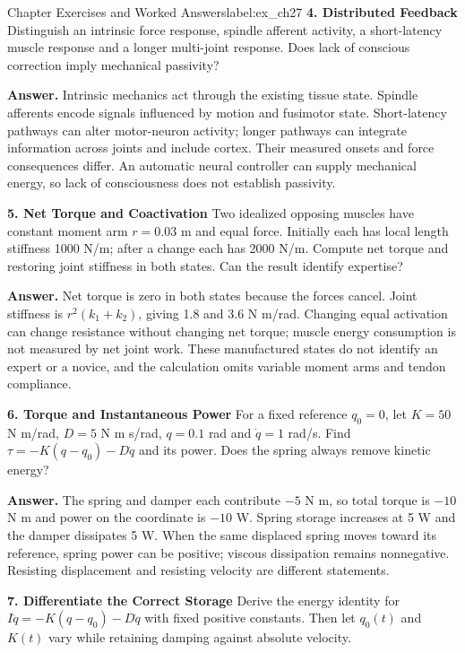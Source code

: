 \begin{exercises}{Chapter Exercises and Worked Answers}{label:ex_ch27}
\textbf{4. Distributed Feedback}
\label{ex:spinal_reflex}
Distinguish an intrinsic force response, spindle afferent activity, a short-latency muscle response and a longer multi-joint response. Does lack of conscious correction imply mechanical passivity?

\textbf{Answer.} Intrinsic mechanics act through the existing tissue state. Spindle afferents encode signals influenced by motion and fusimotor state. Short-latency pathways can alter motor-neuron activity; longer pathways can integrate information across joints and include cortex. Their measured onsets and force consequences differ. An automatic neural controller can supply mechanical energy, so lack of consciousness does not establish passivity.

\textbf{5. Net Torque and Coactivation}
\label{ex:novice_expert}
Two idealized opposing muscles have constant moment arm $r=0.03$ m and equal force. Initially each has local length stiffness 1000 N/m; after a change each has 2000 N/m. Compute net torque and restoring joint stiffness in both states. Can the result identify expertise?

\textbf{Answer.} Net torque is zero in both states because the forces cancel. Joint stiffness is $r^2(k_1+k_2)$, giving 1.8 and 3.6 N m/rad. Changing equal activation can change resistance without changing net torque; muscle energy consumption is not measured by net joint work. These manufactured states do not identify an expert or a novice, and the calculation omits variable moment arms and tendon compliance.

\textbf{6. Torque and Instantaneous Power}
\label{ex:impedance_equation}
For a fixed reference $q_0=0$, let $K=50$ N m/rad, $D=5$ N m s/rad, $q=0.1$ rad and $\dot q=1$ rad/s. Find $\tau=-K(q-q_0)-D\dot q$ and its power. Does the spring always remove kinetic energy?

\textbf{Answer.} The spring and damper each contribute $-5$ N m, so total torque is $-10$ N m and power on the coordinate is $-10$ W. Spring storage increases at 5 W and the damper dissipates 5 W. When the same displaced spring moves toward its reference, spring power can be positive; viscous dissipation remains nonnegative. Resisting displacement and resisting velocity are different statements.

\textbf{7. Differentiate the Correct Storage}
\label{ex:lyapunov_derivative}
Derive the energy identity for $I\ddot q=-K(q-q_0)-D\dot q$ with fixed positive constants. Then let $q_0(t)$ and $K(t)$ vary while retaining damping against absolute velocity.


\end{exercises}
